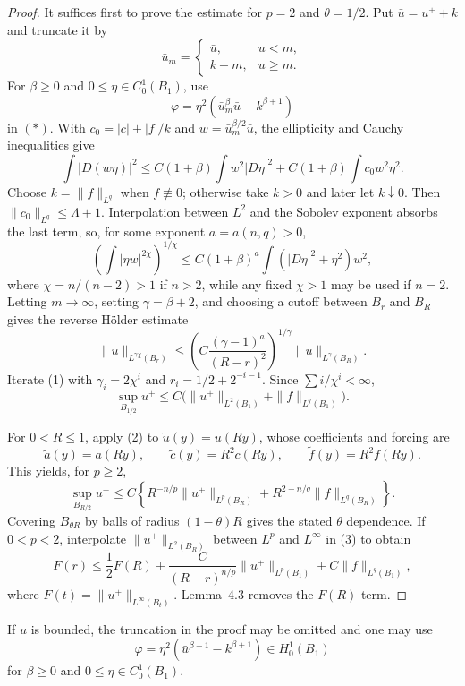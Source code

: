 \begin{proof}
\sketch It suffices first to prove the estimate for $p=2$ and
$\theta=1/2$. Put $\bar u=u^++k$ and truncate it by
\[
\bar u_m=
\begin{cases}
\bar u,&u<m,\\
k+m,&u\geq m.
\end{cases}
\]
For $\beta\geq0$ and $0\leq\eta\in C^1_0(B_1)$, use
\[
\varphi=\eta^2(\bar u_m^\beta\bar u-k^{\beta+1})
\]
in $(*)$. With $c_0=|c|+|f|/k$ and
$w=\bar u_m^{\beta/2}\bar u$, the ellipticity and Cauchy inequalities give
\[
\int|D(w\eta)|^2
\leq C(1+\beta)\int w^2|D\eta|^2
+C(1+\beta)\int c_0w^2\eta^2.
\]
Choose $k=\|f\|_{L^q}$ when $f\not\equiv0$; otherwise take $k>0$ and
later let $k\downarrow0$. Then $\|c_0\|_{L^q}\leq\Lambda+1$.
Interpolation between $L^2$ and the Sobolev exponent absorbs the last term,
so, for some exponent $a=a(n,q)>0$,
\[
\left(\int|\eta w|^{2\chi}\right)^{1/\chi}
\leq C(1+\beta)^a
\int(|D\eta|^2+\eta^2)w^2,
\]
where $\chi=n/(n-2)>1$ if $n>2$, while any fixed $\chi>1$ may be used
if $n=2$. Letting $m\to\infty$, setting $\gamma=\beta+2$, and choosing a
cutoff between $B_r$ and $B_R$ gives the reverse H\"older estimate
\[
\|\bar u\|_{L^{\gamma\chi}(B_r)}
\leq\left(C\frac{(\gamma-1)^a}{(R-r)^2}\right)^{1/\gamma}
\|\bar u\|_{L^\gamma(B_R)}.
\tag{1}
\]
Iterate (1) with $\gamma_i=2\chi^i$ and
$r_i=1/2+2^{-i-1}$. Since $\sum i/\chi^i<\infty$,
\[
\sup_{B_{1/2}}u^+
\leq C\bigl(\|u^+\|_{L^2(B_1)}+\|f\|_{L^q(B_1)}\bigr).
\tag{2}
\]

For $0<R\leq1$, apply (2) to
$\widetilde u(y)=u(Ry)$, whose coefficients and forcing are
\[
\widetilde a(y)=a(Ry),\qquad
\widetilde c(y)=R^2c(Ry),\qquad
\widetilde f(y)=R^2f(Ry).
\]
This yields, for $p\geq2$,
\[
\sup_{B_{R/2}}u^+
\leq C\left\{R^{-n/p}\|u^+\|_{L^p(B_R)}
+R^{2-n/q}\|f\|_{L^q(B_R)}\right\}.
\tag{3}
\]
Covering $B_{\theta R}$ by balls of radius $(1-\theta)R$ gives the stated
$\theta$ dependence. If $0<p<2$, interpolate
$\|u^+\|_{L^2(B_R)}$ between $L^p$ and $L^\infty$ in (3) to obtain
\[
F(r)\leq\frac12F(R)
+\frac{C}{(R-r)^{n/p}}\|u^+\|_{L^p(B_1)}
+C\|f\|_{L^q(B_1)},
\]
where $F(t)=\|u^+\|_{L^\infty(B_t)}$. Lemma~4.3 removes the
$F(R)$ term.
\end{proof}

\begin{remark}\label{hanlin:weaksol-part2-bounded-test-function}
If $u$ is bounded, the truncation in the proof may be omitted and one may use
\[
\varphi=\eta^2(\bar u^{\beta+1}-k^{\beta+1})
\in H^1_0(B_1)
\]
for $\beta\geq0$ and $0\leq\eta\in C^1_0(B_1)$.
\end{remark}

